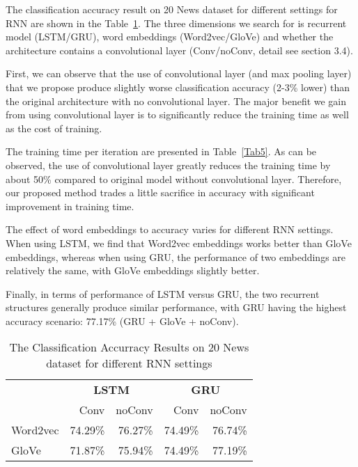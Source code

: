 \documentclass{article}
\begin{document}
The classification accuracy result on 20 News dataset for different settings for RNN are shown in the Table~\ref{Tab4}.
The three dimensions we search for is recurrent model (LSTM/GRU), word embeddings (Word2vec/GloVe) and whether the architecture contains a convolutional layer (Conv/noConv, detail see section 3.4). 

First, we can observe that the use of convolutional layer (and max pooling layer) that we propose produce slightly worse classification accuracy (2-3\% lower) than the original architecture with no convolutional layer. The major benefit we gain from using convolutional layer is to significantly reduce the training time as well as the cost of training. 

The training time per iteration are presented in Table~\ref{Tab5}. As can be observed, the use of convolutional layer greatly reduces the training time by about 50\% compared to original model without convolutional layer. Therefore, our proposed method trades a little sacrifice in accuracy with significant improvement in training time.

The effect of word embeddings to accuracy varies for different RNN settings. When using LSTM, we find that Word2vec embeddings works better than GloVe embeddings, whereas when using GRU, the performance of  two embeddings are relatively the same, with GloVe embeddings slightly better.

Finally, in terms of performance of  LSTM versus GRU, the two recurrent structures generally produce similar performance, with GRU having the highest accuracy scenario: 77.17\% (GRU + GloVe + noConv).
 


\begin{table}
    \begin{tabular}{lrrrr}\toprule
        &\multicolumn{2}{c}{\textbf{LSTM}}&\multicolumn{2}{c}{\textbf{GRU}}
        \\\cmidrule(r){2-3}\cmidrule(r){4-5}
        &Conv&noConv&Conv&noConv\\\midrule
        Word2vec    & 74.29\% & 76.27\% & 74.49\% & 76.74\%\\
        GloVe   & 71.87\% & 75.94\% & 74.49\% & 77.19\%\\\bottomrule
    \end{tabular}
    \caption{\small The Classification Accurracy Results on 20 News dataset for different RNN settings}\label{Tab4}
\end{table}
\end{document}
